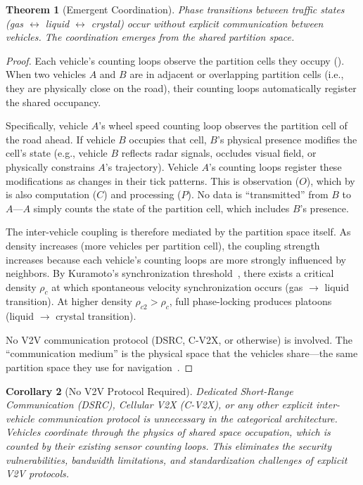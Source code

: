 \documentclass[twocolumn,10pt]{article}
\newtheorem{theorem}{Theorem}[section]
\newtheorem{corollary}[theorem]{Corollary}
\theoremstyle{definition}
\begin{document}
\begin{theorem}[Emergent Coordination]
\label{thm:emergent-coordination}
Phase transitions between traffic states (gas $\leftrightarrow$ liquid $\leftrightarrow$ crystal) occur without explicit communication between vehicles. The coordination emerges from the shared partition space.
\end{theorem}

\begin{proof}
Each vehicle's counting loops observe the partition cells they occupy (). When two vehicles $A$ and $B$ are in adjacent or overlapping partition cells (i.e., they are physically close on the road), their counting loops automatically register the shared occupancy.

Specifically, vehicle $A$'s wheel speed counting loop observes the partition cell of the road ahead. If vehicle $B$ occupies that cell, $B$'s physical presence modifies the cell's state (e.g., vehicle $B$ reflects radar signals, occludes visual field, or physically constrains $A$'s trajectory). Vehicle $A$'s counting loops register these modifications as changes in their tick patterns. This is observation ($O$), which by  is also computation ($C$) and processing ($P$). No data is ``transmitted'' from $B$ to $A$---$A$ simply counts the state of the partition cell, which includes $B$'s presence.

The inter-vehicle coupling is therefore mediated by the partition space itself. As density increases (more vehicles per partition cell), the coupling strength increases because each vehicle's counting loops are more strongly influenced by neighbors. By Kuramoto's synchronization threshold~\cite{kuramoto1984}, there exists a critical density $\rho_c$ at which spontaneous velocity synchronization occurs (gas $\to$ liquid transition). At higher density $\rho_{c2} > \rho_c$, full phase-locking produces platoons (liquid $\to$ crystal transition).

No V2V communication protocol (DSRC, C-V2X, or otherwise) is involved. The ``communication medium'' is the physical space that the vehicles share---the same partition space they use for navigation~\cite{sachikonye2026sango}.
\end{proof}

\begin{corollary}[No V2V Protocol Required]
\label{cor:no-v2v}
Dedicated Short-Range Communication (DSRC), Cellular V2X (C-V2X), or any other explicit inter-vehicle communication protocol is unnecessary in the categorical architecture. Vehicles coordinate through the physics of shared space occupation, which is counted by their existing sensor counting loops. This eliminates the security vulnerabilities, bandwidth limitations, and standardization challenges of explicit V2V protocols.
\end{corollary}
\end{document}
